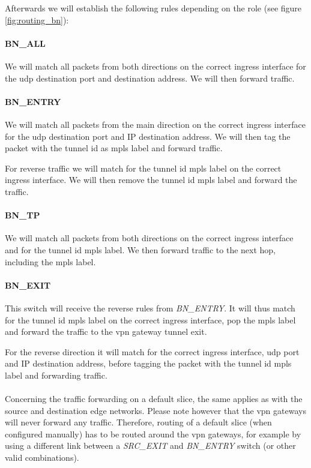 Afterwards we will establish the following rules depending on the role (see figure \ref{fig:routing_bn}):

\paragraph{BN\_ALL} We will match all packets from both directions on the correct ingress interface for the \acrshort{udp} destination port and destination address. We will then forward traffic.

\paragraph{BN\_ENTRY} We will match all packets from the main direction on the correct ingress interface for the \acrshort{udp} destination port and IP destination address. We will then tag the packet with the tunnel id as \acrshort{mpls} label and forward traffic.

For reverse traffic we will match for the tunnel id \acrshort{mpls} label on the correct ingress interface. We will then remove the tunnel id \acrshort{mpls} label and forward the traffic.

\paragraph{BN\_TP} We will match all packets from both directions on the correct ingress interface and for the tunnel id \acrshort{mpls} label. We then forward traffic to the next hop, including the \acrshort{mpls} label.

\paragraph{BN\_EXIT} This switch will receive the reverse rules from \textit{BN\_ENTRY}. It will thus match for the tunnel id \acrshort{mpls} label on the correct ingress interface, pop the \acrshort{mpls} label and forward the traffic to the \acrshort{vpn} gateway tunnel exit.

For the reverse direction it will match for the correct ingress interface, \acrshort{udp} port and IP destination address, before tagging the packet with the tunnel id \acrshort{mpls} label and forwarding traffic.

\paragraph{} Concerning the traffic forwarding on a default slice, the same applies as with the source and destination edge networks. Please note however that the \acrshort{vpn} gateways will never forward any traffic. Therefore, routing of a default slice (when configured manually) has to be routed around the \acrshort{vpn} gateways, for example by using a different link between a \textit{SRC\_EXIT} and \textit{BN\_ENTRY} switch (or other valid combinations).

